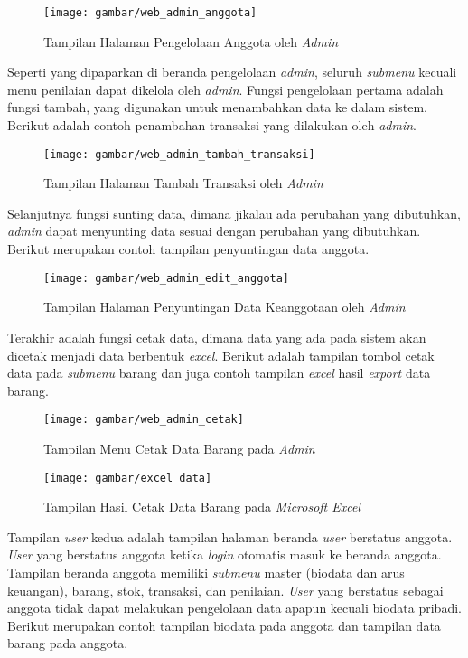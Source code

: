 \begin{figure}[H]
	\centering
	\texttt{[image: gambar/web\_admin\_anggota]}
	\caption{Tampilan Halaman Pengelolaan Anggota oleh \textit{Admin}}
\end{figure} 

Seperti yang dipaparkan di beranda pengelolaan \textit{admin}, seluruh \textit{submenu} kecuali menu penilaian dapat dikelola oleh \textit{admin}. Fungsi pengelolaan pertama adalah fungsi tambah, yang digunakan untuk menambahkan data ke dalam sistem. Berikut adalah contoh penambahan transaksi yang dilakukan oleh \textit{admin}.

\begin{figure}[H]
	\centering
	\texttt{[image: gambar/web\_admin\_tambah\_transaksi]}
	\caption{Tampilan Halaman Tambah Transaksi oleh \textit{Admin}}
\end{figure} 

Selanjutnya fungsi sunting data, dimana jikalau ada perubahan yang dibutuhkan, \textit{admin} dapat menyunting data sesuai dengan perubahan yang dibutuhkan. Berikut merupakan contoh tampilan penyuntingan data anggota.

\begin{figure}[H]
	\centering
	\texttt{[image: gambar/web\_admin\_edit\_anggota]}
	\caption{Tampilan Halaman Penyuntingan Data Keanggotaan oleh \textit{Admin}}
\end{figure} 

Terakhir adalah fungsi cetak data, dimana data yang ada pada sistem akan dicetak menjadi data berbentuk \textit{excel}. Berikut adalah tampilan tombol cetak data pada \textit{submenu} barang dan juga contoh tampilan \textit{excel} hasil \textit{export} data barang.

\begin{figure}[H]
	\centering
	\texttt{[image: gambar/web\_admin\_cetak]}
	\caption{Tampilan Menu Cetak Data Barang pada \textit{Admin}}
\end{figure} 

\begin{figure}[H]
	\centering
	\texttt{[image: gambar/excel\_data]}
	\caption{Tampilan Hasil Cetak Data Barang pada \textit{Microsoft Excel}}
\end{figure} 

Tampilan \textit{user} kedua adalah tampilan halaman beranda \textit{user} berstatus anggota. \textit{User} yang berstatus anggota ketika \textit{login} otomatis masuk ke beranda anggota. Tampilan beranda anggota memiliki \textit{submenu} master (biodata dan arus keuangan), barang, stok, transaksi, dan penilaian. \textit{User} yang berstatus sebagai anggota tidak dapat melakukan pengelolaan data apapun kecuali biodata pribadi. Berikut merupakan contoh tampilan biodata pada anggota dan tampilan data barang pada anggota.

